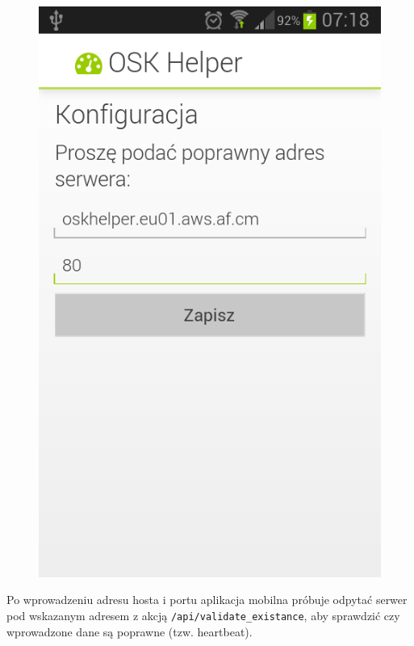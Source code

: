 \documentclass[twoside,a4paper,openright,12pt]{book}
\begin{document}
\begin{figure}[H]
\begin{minipage}{.48\textwidth}
  \centering
  \includegraphics[width=1\linewidth]{screenshots/android/konfiguracja_serwera-wypelnione.png}
  \label{fig:ekran_poczatkowy2}
\end{minipage}
\end{figure}

Po wprowadzeniu adresu hosta i portu aplikacja mobilna próbuje odpytać serwer pod wskazanym adresem z akcją \texttt{/api/validate\_existance}, aby sprawdzić czy wprowadzone dane są poprawne (tzw. heartbeat).
\end{document}
